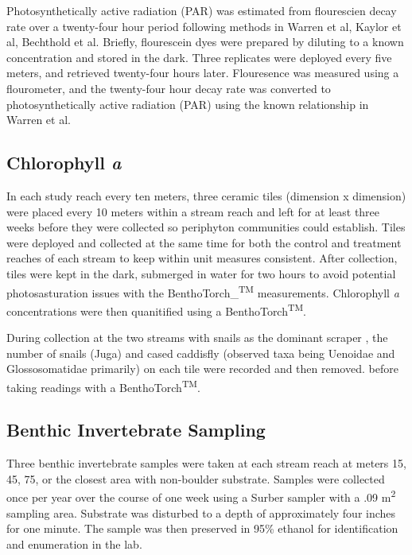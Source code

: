\documentclass[double,12pt]{beavtex}
\begin{document}
  Photosynthetically active radiation (PAR) was estimated from flourescien
  decay rate over a twenty-four hour period following methods in Warren et
  al, Kaylor et al, Bechthold et al. Briefly, flourescein dyes were
  prepared by diluting to a known concentration and stored in the dark.
  Three replicates were deployed every five meters, and retrieved
  twenty-four hours later. Flouresence was measured using a flourometer,
  and the twenty-four hour decay rate was converted to photosynthetically
  active radiation (PAR) using the known relationship in Warren et al.
  
  \subsection*{\texorpdfstring{Chlorophyll
  \emph{a}}{Chlorophyll a}}\label{chlorophyll-a}
  
  In each study reach every ten meters, three ceramic tiles (dimension x
  dimension) were placed every 10 meters within a stream reach and left
  for at least three weeks before they were collected so periphyton
  communities could establish. Tiles were deployed and collected at the
  same time for both the control and treatment reaches of each stream to
  keep within unit measures consistent. After collection, tiles were kept
  in the dark, submerged in water for two hours to avoid potential
  photosasturation issues with the BenthoTorch\_\textsuperscript{TM}
  measurements. Chlorophyll \emph{a} concentrations were then quanitified
  using a BenthoTorch\textsuperscript{TM}.
  
  During collection at the two streams with snails as the dominant scraper
  , the number of snails (Juga) and cased caddisfly (observed taxa being
  Uenoidae and Glossosomatidae primarily) on each tile were recorded and
  then removed. before taking readings with a
  BenthoTorch\textsuperscript{TM}.
  
  \subsection*{Benthic Invertebrate
  Sampling}\label{benthic-invertebrate-sampling}
  
  Three benthic invertebrate samples were taken at each stream reach at
  meters 15, 45, 75, or the closest area with non-boulder substrate.
  Samples were collected once per year over the course of one week using a
  Surber sampler with a .09 m\textsuperscript{2} sampling area. Substrate
  was disturbed to a depth of approximately four inches for one minute.
  The sample was then preserved in 95\% ethanol for identification and
  enumeration in the lab.
  
\end{document}
